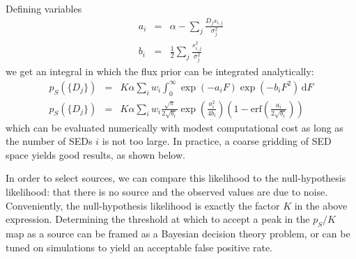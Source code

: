 \documentclass[letterpaper,preprint]{aastex62}
\newcommand{\dd}{\mathrm{d}}
\newcommand{\erf}{\textrm{erf}}
\begin{document}
Defining variables
\begin{eqnarray}
  a_i &=& \alpha - \sum_j \frac{D_j s_{i,j}}{\sigma_j^2} \\
  b_i &=& \frac{1}{2} \sum_j \frac{s_{i,j}^2}{\sigma_j^2}
\end{eqnarray}
we get an integral in which the flux prior can be integrated analytically:
%
\begin{eqnarray}
  p_S(\{ D_j \})
  &=&
  K \alpha
  \sum_i w_i 
  \int_0^{\infty}
    \exp(-a_i F) \exp(-b_i F^2)
    \, \dd F
    \\
  p_S(\{ D_j \})
  &=&
  K \alpha
  \sum_i w_i 
  \frac{\sqrt{\pi}}{2 \sqrt{b_i}}
  \exp \left(\frac{a_i^2}{4 b_i} \right)
  \left(1 - \erf\left( \frac{a_i}{2 \sqrt{b_i}} \right) \right)
  \label{eq:pfg}
\end{eqnarray}
which can be evaluated numerically with modest computational cost as
long as the number of SEDs $i$ is not too large.  In practice, a
coarse gridding of SED space yields good results, as shown below.




In order to select sources, we can compare this likelihood to the
null-hypothesis likelihood: that there is no source and the observed
values are due to noise.  Conveniently, the null-hypothesis likelihood
is exactly the factor $K$ in the above expression.  Determining the
threshold at which to accept a peak in the $p_S/K$ map as a source can
be framed as a Bayesian decision theory problem, or can be tuned on
simulations to yield an acceptable false positive rate.
\end{document}
